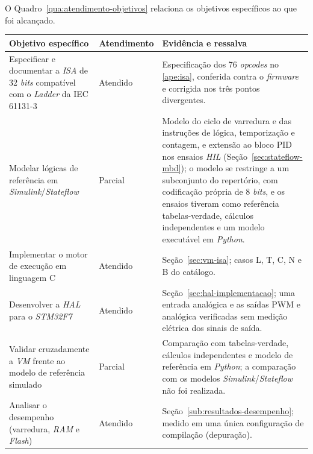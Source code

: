 O Quadro~\ref{qua:atendimento-objetivos} relaciona os objetivos específicos ao que foi alcançado.

\begin{quadrofixo}
    \centering
    \small
    \begin{tabular}{|p{5.4cm}|p{2.2cm}|p{6.6cm}|}
        \hline
        Objetivo específico & Atendimento & Evidência e ressalva \\
        \hline
        Especificar e documentar a \textit{ISA} de 32 \textit{bits} compatível com o \textit{Ladder} da IEC 61131-3 & Atendido & Especificação dos 76 \textit{opcodes} no \ref{ape:isa}, conferida contra o \textit{firmware} e corrigida nos três pontos divergentes. \\
        \hline
        Modelar lógicas de referência em \textit{Simulink}/\textit{Stateflow} & Parcial & Modelo do ciclo de varredura e das instruções de lógica, temporização e contagem, e extensão ao bloco PID nos ensaios \textit{HIL} (Seção~\ref{sec:stateflow-mbd}); o modelo se restringe a um subconjunto do repertório, com codificação própria de 8 \textit{bits}, e os ensaios tiveram como referência tabelas-verdade, cálculos independentes e um modelo executável em \textit{Python}. \\
        \hline
        Implementar o motor de execução em linguagem C & Atendido & Seção~\ref{sec:vm-isa}; casos L, T, C, N e B do catálogo. \\
        \hline
        Desenvolver a \textit{HAL} para o \textit{STM32F7} & Atendido & Seção~\ref{sec:hal-implementacao}; uma entrada analógica e as saídas PWM e analógica verificadas sem medição elétrica dos sinais de saída. \\
        \hline
        Validar cruzadamente a \textit{VM} frente ao modelo de referência simulado & Parcial & Comparação com tabelas-verdade, cálculos independentes e modelo de referência em \textit{Python}; a comparação com os modelos \textit{Simulink}/\textit{Stateflow} não foi realizada. \\
        \hline
        Analisar o desempenho (varredura, \textit{RAM} e \textit{Flash}) & Atendido & Seção~\ref{sub:resultados-desempenho}; medido em uma única configuração de compilação (depuração). \\
        \hline
    \end{tabular}

    \label{qua:atendimento-objetivos}
\end{quadrofixo}

